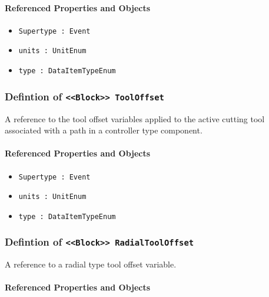 \FloatBarrier
\paragraph{Referenced Properties and Objects}

\begin{itemize}
\item \texttt{Supertype : Event}

\item \texttt{units : UnitEnum}

\item \texttt{type : DataItemTypeEnum}

\end{itemize}
\FloatBarrier
\subsubsection{Defintion of \texttt{<<Block>> ToolOffset}}
  \label{type:ToolOffset}

\FloatBarrier

A reference to the tool offset variables applied to the active cutting tool associated with a path in a controller type component.

\FloatBarrier
\paragraph{Referenced Properties and Objects}

\begin{itemize}
\item \texttt{Supertype : Event}

\item \texttt{units : UnitEnum}

\item \texttt{type : DataItemTypeEnum}

\end{itemize}
\FloatBarrier
\subsubsection{Defintion of \texttt{<<Block>> RadialToolOffset}}
  \label{type:RadialToolOffset}

\FloatBarrier

A reference to a radial type tool offset variable.

\FloatBarrier
\paragraph{Referenced Properties and Objects}


